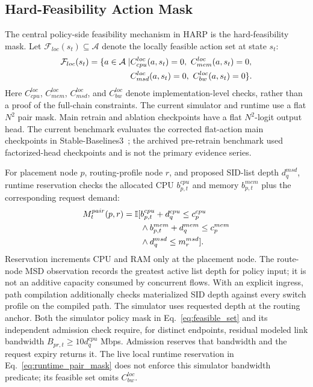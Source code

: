 \documentclass[final,5p]{elsarticle}
\newcommand{\rev}[1]{\textcolor{revisiongreen}{#1}}
\let\newrev\rev
\begin{document}
\subsection{Hard-Feasibility Action Mask}
\label{subsec:harp_masking}

The central \rev{policy-side feasibility mechanism} in HARP is the hard-feasibility mask. Let \(\mathcal{F}_{loc}(s_t)\subseteq\mathcal{A}\) denote the \rev{locally feasible} action set at state \(s_t\):
\begin{equation}
\rev{\begin{aligned}
\mathcal{F}_{loc}(s_t)=\{a\in\mathcal A\mid
&C_{cpu}^{loc}(a,s_t)=0,\ C_{mem}^{loc}(a,s_t)=0,\\
&C_{msd}^{loc}(a,s_t)=0,\ C_{bw}^{loc}(a,s_t)=0\}.
\end{aligned}}
\label{eq:feasible_set}
\end{equation}
Here \(C_{cpu}^{loc}\), \(C_{mem}^{loc}\), \(C_{msd}^{loc}\), and \(C_{bw}^{loc}\) denote implementation-level checks, rather than a proof of the full-chain constraints. The current simulator and runtime use a flat \(N^2\) pair mask. Main retrain and ablation checkpoints have a flat \(N^2\)-logit output head. \newrev{The current benchmark evaluates the corrected flat-action main checkpoints in Stable-Baselines3~\cite{raffin2021sb3}; the archived pre-retrain benchmark used factorized-head checkpoints and is not the primary evidence series.}

\newrev{For placement node \(p\), routing-profile node \(r\), and proposed SID-list depth \(d_q^{msd}\), runtime reservation checks the allocated CPU \(b^{cpu}_{p,t}\) and memory \(b^{mem}_{p,t}\) plus the corresponding request demand:}
\begin{equation}
\color{revisiongreen}
\begin{aligned}
M^{pair}_t(p,r)=\mathbb I[&b^{cpu}_{p,t}+d_q^{cpu}\le c_p^{cpu}\\
&\land b^{mem}_{p,t}+d_q^{mem}\le c_p^{mem}\\
&\land d_q^{msd}\le m_r^{msd}].
\end{aligned}
\label{eq:runtime_pair_mask}
\end{equation}
\newrev{Reservation increments CPU and RAM only at the placement node. The route-node MSD observation records the greatest active list depth for policy input; it is not an additive capacity consumed by concurrent flows. With an explicit ingress, path compilation additionally checks materialized SID depth against every switch profile on the compiled path. The simulator uses requested depth at the routing anchor. Both the simulator policy mask in Eq.~\eqref{eq:feasible_set} and its independent admission check require, for distinct endpoints, residual modeled link bandwidth \(B_{pr,t}\ge 10d_q^{cpu}\) Mbps. Admission reserves that bandwidth and the request expiry returns it. The live local runtime reservation in Eq.~\eqref{eq:runtime_pair_mask} does not enforce this simulator bandwidth predicate; its feasible set omits \(C_{bw}^{loc}\).}
\end{document}
